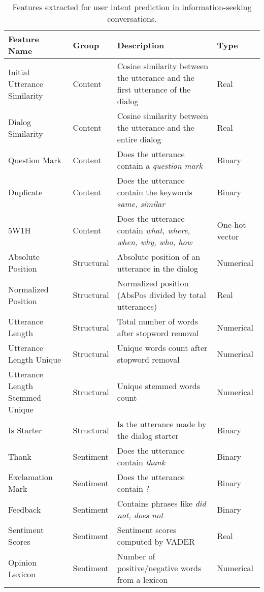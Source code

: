\documentclass{article}
\begin{document}
\begin{table}[htbp]
\centering
\caption{Features extracted for user intent prediction in information-seeking conversations.}
\label{tab:features}
\scriptsize
\begin{tabular}{>{\raggedright\arraybackslash}p{3cm} p{2cm} p{6.5cm} p{2cm}}
\toprule
\textbf{Feature Name} & \textbf{Group} & \textbf{Description} & \textbf{Type} \\
\midrule
Initial Utterance Similarity & Content & Cosine similarity between the utterance and the first utterance of the dialog & Real \\
Dialog Similarity & Content & Cosine similarity between the utterance and the entire dialog & Real \\
Question Mark & Content & Does the utterance contain a \textit{question mark} & Binary \\
Duplicate & Content & Does the utterance contain the keywords \textit{same, similar} & Binary \\
5W1H & Content & Does the utterance contain \textit{what, where, when, why, who, how} & One-hot vector \\
\midrule
Absolute Position & Structural & Absolute position of an utterance in the dialog & Numerical \\
Normalized Position & Structural & Normalized position (AbsPos divided by total utterances) & Real \\
Utterance Length & Structural & Total number of words after stopword removal & Numerical \\
Utterance Length Unique & Structural & Unique words count after stopword removal & Numerical \\
Utterance Length Stemmed Unique & Structural & Unique stemmed words count & Numerical \\
Is Starter & Structural & Is the utterance made by the dialog starter & Binary \\
\midrule
Thank & Sentiment & Does the utterance contain \textit{thank} & Binary \\
Exclamation Mark & Sentiment & Does the utterance contain \textit{!} & Binary \\
Feedback & Sentiment & Contains phrases like \textit{did not, does not} & Binary \\
Sentiment Scores & Sentiment & Sentiment scores computed by VADER & Real \\
Opinion Lexicon & Sentiment & Number of positive/negative words from a lexicon & Numerical \\
\bottomrule
\end{tabular}
\end{table}
\end{document}
